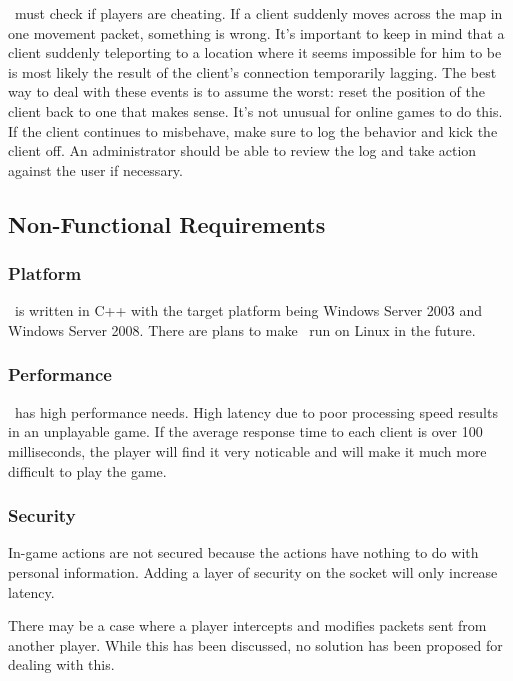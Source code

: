 \GameServer\ must check if players are cheating. If a client suddenly moves across the map in one movement packet, something is wrong. It's important to keep in mind that a client suddenly teleporting to a location where it seems impossible for him to be is most likely the result of the client's connection temporarily lagging. The best way to deal with these events is to assume the worst: reset the position of the client back to one that makes sense. It's not unusual for online games to do this. If the client continues to misbehave, make sure to log the behavior and kick the client off. An administrator should be able to review the log and take action against the user if necessary.

\subsection{Non-Functional Requirements}

\subsubsection*{Platform}

\GameServer\ is written in C++ with the target platform being Windows Server 2003 and Windows Server 2008. There are plans to make \GameServer\ run on Linux in the future.

\subsubsection*{Performance}

\GameServer\ has high performance needs. High latency due to poor processing speed results in an unplayable game. If the average response time to each client is over 100 milliseconds, the player will find it very noticable and will make it much more difficult to play the game.

\subsubsection*{Security}

In-game actions are not secured because the actions have nothing to do with personal information. Adding a layer of security on the socket will only increase latency.

There may be a case where a player intercepts and modifies packets sent from another player. While this has been discussed, no solution has been proposed for dealing with this.

